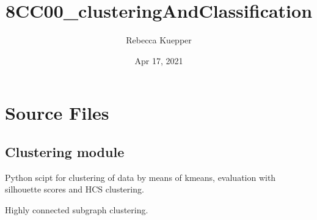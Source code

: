 \documentclass[letterpaper,10pt,english]{sphinxmanual}
\title{8CC00\_clusteringAndClassification}
\date{Apr 17, 2021}
\author{Rebecca Kuepper}
\begin{document}
\pagestyle{empty}
\sphinxmaketitle
\pagestyle{plain}
\sphinxtableofcontents
\pagestyle{normal}
\label{\detokenize{index::doc}}



\chapter{Source Files}
\label{\detokenize{modules:source-files}}\label{\detokenize{modules::doc}}

\section{Clustering module}
\label{\detokenize{clustering:module-clustering}}\label{\detokenize{clustering:clustering-module}}\label{\detokenize{clustering::doc}}
\sphinxAtStartPar
Python scipt for clustering of data by means of k\sphinxhyphen{}means, evaluation with silhouette scores and HCS clustering.

\begin{fulllineitems}
\label{\detokenize{clustering:clustering.HCS}}
\sphinxAtStartPar
Highly connected subgraph clustering.

\end{fulllineitems}

\end{document}
